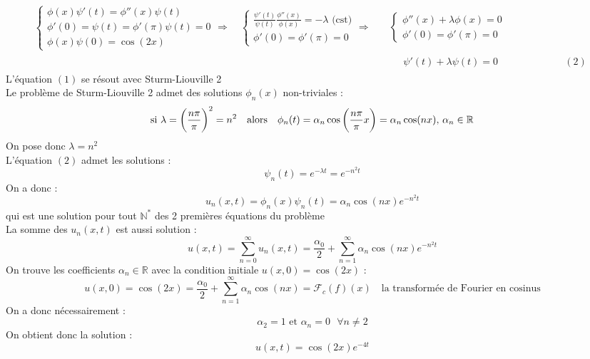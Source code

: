\begin{align*}
    \begin{cases}
        \phi(x)\psi'(t) = \phi''(x)\psi(t) \\
        \phi'(0) = \psi(t) = \phi'(\pi)\psi(t) = 0 \\
        \phi(x)\psi(0) = \cos(2x)
    \end{cases}
    \Rightarrow \quad
    \begin{cases}
        \frac{\psi'(t)}{\psi(t)} \frac{\phi''(x)}{\phi(x)} = -\lambda \text{ (cst)} \\
        \phi'(0) = \phi'(\pi) = 0
    \end{cases}
    \Rightarrow \quad
    &\begin{cases}
            \phi''(x) + \lambda \phi(x) = 0 \tag{1} \\
            \phi'(0) = \phi'(\pi) = 0
    \end{cases} \\
    &\begin{aligned}
        \quad \psi'(t) + \lambda \psi(t) = 0 \qquad \qquad \qquad \text{ }(2)
    \end{aligned}
\end{align*}
L'équation $(1)$ se résout avec Sturm-Liouville 2 \\
Le problème de Sturm-Liouville 2 admet des solutions $\phi_n(x)$ non-triviales : \\
$$\text{si } \lambda = \bigg{(} \frac{n\pi}{\pi} \bigg{)}^2 = n^2 \quad \text{alors} \quad \phi_n(t) = \alpha_n \cos \bigg{(} \frac{n\pi}{\pi}x \bigg{)} = \alpha_n \cos(nx) \text{, } \alpha_n \in \mathbb{R}$$
On pose donc $\lambda = n^2$ \\
L'équation $(2)$ admet les solutions :
$$\psi_n(t) = e^{-\lambda t} = e^{-n^2t}$$
On a donc :
$$u_n(x,t) = \phi_n(x)\psi_n(t) = \alpha_n\cos(nx)e^{-n^2t}$$
qui est une solution pour tout $\mathbb{N}^*$ des 2 premières équations du problème \\
La somme des $u_n(x,t)$ est aussi solution :
$$u(x,t) = \sum_{n=0}^{\infty} u_n(x,t) = \frac{\alpha_0}{2} + \sum_{n=1}^{\infty} \alpha_n \cos(nx)e^{-n^2t}$$
On trouve les coefficients $\alpha_n \in \mathbb{R}$ avec la condition initiale $u(x,0) = \cos(2x)$ :
$$u(x,0) = \cos(2x) = \frac{\alpha_0}{2} + \sum_{n=1}^{\infty} \alpha_n \cos(nx) = \mathcal{F}_c(f)(x) \quad \text{la transformée de Fourier en cosinus}$$
On a donc nécessairement :
$$\alpha_2 = 1 \text{ et } \alpha_n = 0 \text{ } \forall n \neq 2$$
On obtient donc la solution :
$$u(x,t) = \cos(2x) e^{-4t}$$

